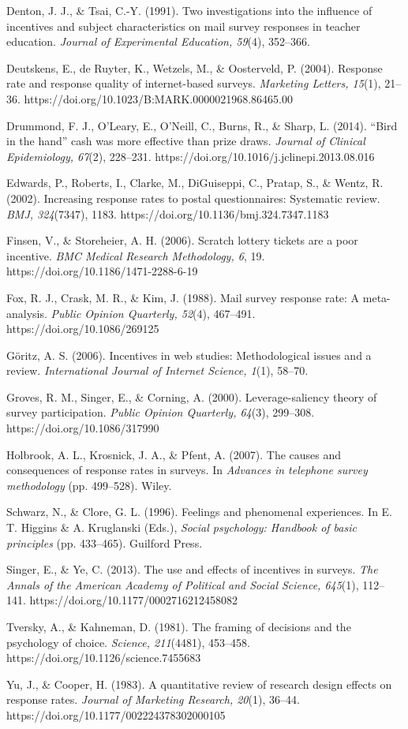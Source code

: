 Denton, J. J., \& Tsai, C.-Y. (1991). Two investigations into the influence of incentives and subject characteristics on mail survey responses in teacher education. \textit{Journal of Experimental Education, 59}(4), 352–366.

Deutskens, E., de Ruyter, K., Wetzels, M., \& Oosterveld, P. (2004). Response rate and response quality of internet-based surveys. \textit{Marketing Letters, 15}(1), 21–36. https://doi.org/10.1023/B:MARK.0000021968.86465.00

Drummond, F. J., O’Leary, E., O’Neill, C., Burns, R., \& Sharp, L. (2014). “Bird in the hand” cash was more effective than prize draws. \textit{Journal of Clinical Epidemiology, 67}(2), 228–231. https://doi.org/10.1016/j.jclinepi.2013.08.016

Edwards, P., Roberts, I., Clarke, M., DiGuiseppi, C., Pratap, S., \& Wentz, R. (2002). Increasing response rates to postal questionnaires: Systematic review. \textit{BMJ, 324}(7347), 1183. https://doi.org/10.1136/bmj.324.7347.1183

Finsen, V., \& Storeheier, A. H. (2006). Scratch lottery tickets are a poor incentive. \textit{BMC Medical Research Methodology, 6}, 19. https://doi.org/10.1186/1471-2288-6-19

Fox, R. J., Crask, M. R., \& Kim, J. (1988). Mail survey response rate: A meta-analysis. \textit{Public Opinion Quarterly, 52}(4), 467–491. https://doi.org/10.1086/269125

Göritz, A. S. (2006). Incentives in web studies: Methodological issues and a review. \textit{International Journal of Internet Science, 1}(1), 58–70.

Groves, R. M., Singer, E., \& Corning, A. (2000). Leverage-saliency theory of survey participation. \textit{Public Opinion Quarterly, 64}(3), 299–308. https://doi.org/10.1086/317990

Holbrook, A. L., Krosnick, J. A., \& Pfent, A. (2007). The causes and consequences of response rates in surveys. In \textit{Advances in telephone survey methodology} (pp. 499–528). Wiley.

Schwarz, N., \& Clore, G. L. (1996). Feelings and phenomenal experiences. In E. T. Higgins \& A. Kruglanski (Eds.), \textit{Social psychology: Handbook of basic principles} (pp. 433–465). Guilford Press.

Singer, E., \& Ye, C. (2013). The use and effects of incentives in surveys. \textit{The Annals of the American Academy of Political and Social Science, 645}(1), 112–141. https://doi.org/10.1177/0002716212458082

Tversky, A., \& Kahneman, D. (1981). The framing of decisions and the psychology of choice. \textit{Science, 211}(4481), 453–458. https://doi.org/10.1126/science.7455683

Yu, J., \& Cooper, H. (1983). A quantitative review of research design effects on response rates. \textit{Journal of Marketing Research, 20}(1), 36–44. https://doi.org/10.1177/002224378302000105


